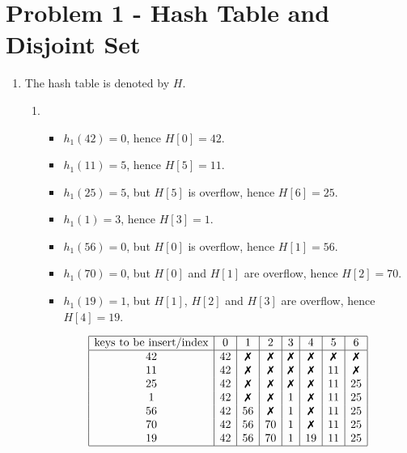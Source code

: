 \documentclass[12pt,a4paper,titlepage,AutoFakeBold]{article}
\newcommand{\uxm}{\textup{\ding{55}}}
\begin{document}
\section*{Problem 1 - Hash Table and Disjoint Set}
\begin{enumerate}[label=\arabic*.,topsep=0pt]
    \item The hash table is denoted by $H$.
    \begin{enumerate}[label=(\alph*),topsep=0pt]
        \item \begin{itemize}[noitemsep,topsep=0pt]
            \item $h_1(42) = 0$, hence $H[0] = 42$.
            \item $h_1(11) = 5$, hence $H[5] = 11$.
            \item $h_1(25) = 5$, but $H[5]$ is overflow, hence $H[6] = 25$.
            \item $h_1(1) = 3$, hence $H[3] = 1$.
            \item $h_1(56) = 0$, but $H[0]$ is overflow, hence $H[1] = 56$.
            \item $h_1(70) = 0$, but $H[0]$ and $H[1]$ are overflow, hence $H[2] = 70$.
            \item $h_1(19) = 1$, but $H[1]$, $H[2]$ and $H[3]$ are overflow, hence $H[4] = 19$.
        \end{itemize}
        \[
            \begin{array}{|c|c|c|c|c|c|c|c|}
                \hline\textup{keys to be insert}  / \textup{index}{}&  0 {}& 1 {}& 2 {}& 3 {}& 4 {}& 5 {}& 6\\ 
                \hline
                42 {}& 42  {}& \uxm  {}& \uxm  {}& \uxm  {}& \uxm  {}& \uxm  {}& \uxm \\
                11 {}& 42 {}& \uxm   {}& \uxm  {}& \uxm  {}& \uxm {}& 11  {}& \uxm \\ 
                25 {}& 42 {}& \uxm   {}& \uxm  {}& \uxm  {}& \uxm {}& 11  {}& 25 \\ 
                1 {}& 42 {}& \uxm   {}& \uxm  {}& 1  {}& \uxm {}& 11  {}& 25 \\ 
                56 {}& 42 {}& 56   {}& \uxm  {}& 1  {}& \uxm {}& 11  {}& 25 \\ 
                70 {}& 42 {}& 56   {}& 70  {}& 1  {}& \uxm {}& 11  {}& 25 \\ 
                19 {}& 42 {}& 56   {}& 70  {}& 1  {}& 19 {}& 11  {}& 25 \\ 
                \hline
            \end{array}
\]
\end{enumerate}
\end{enumerate}
\end{document}
